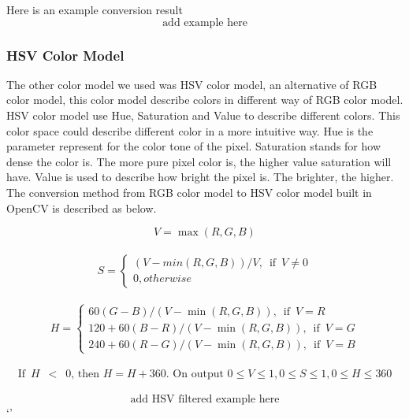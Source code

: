             Here is an example conversion result
            $$ \textrm{add example here} $$
        \subsubsection{HSV Color Model}
            The other color model we used was HSV color model, an alternative of RGB color model, this color model describe colors in different way of RGB color model.
            HSV color model use Hue, Saturation and Value to describe different colors.
            This color space could describe different color in a more intuitive way.
            Hue is the parameter represent for the color tone of the pixel. %
            Saturation stands for how dense the color is. The more pure pixel color is, the higher value saturation will have.
            Value is used to describe how bright the pixel is. The brighter, the higher.
            The conversion method from RGB color model to HSV color model built in OpenCV is described as below.

            $$
                V = \max(R,G,B)
            $$\\
            $$
                S = 
                \begin{cases}   
                    {{{(V-min(R,G,B))}/{V}}, \enspace\textrm{if}\enspace V \neq 0}\\
                    {0, otherwise}
                \end{cases}
            $$\\
            $$
                H =
                \begin{cases} 
                    {{60(G - B)}/{(V-\min(R,G,B))}, \enspace\textrm{if}\enspace V=R}\\
                    {{120+60(B - R)}/{(V-\min(R,G,B))}, \enspace\textrm{if}\enspace V=G}\\
                    {{240+60(R - G)}/{(V-\min(R,G,B))}, \enspace\textrm{if}\enspace V=B}
                \end{cases}
            $$\\
            $$
                \textrm{If} \enspace H \enspace < \enspace 0 \textrm{, then } H = H + 360. \textrm{ On output } 0 \leq V \leq 1, 0 \leq S \leq 1, 0 \leq H \leq 360
            $$\\
            $$ \textrm{add HSV filtered example here} $$
`'
